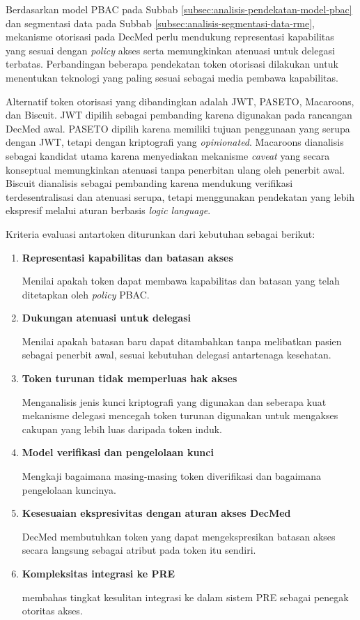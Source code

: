 \documentclass[bahasa, 12pt, a4paper, onecolumn, oneside, final]{report}
\begin{document}
Berdasarkan model PBAC pada Subbab \ref{subsec:analisis-pendekatan-model-pbac} dan segmentasi data pada Subbab \ref{subsec:analisis-segmentasi-data-rme}, mekanisme otorisasi pada DecMed perlu mendukung representasi kapabilitas yang sesuai dengan \textit{policy} akses serta memungkinkan atenuasi untuk delegasi terbatas. Perbandingan beberapa pendekatan token otorisasi dilakukan untuk menentukan teknologi yang paling sesuai sebagai media pembawa kapabilitas.

Alternatif token otorisasi yang dibandingkan adalah JWT, PASETO, Macaroons, dan Biscuit. JWT dipilih sebagai pembanding karena digunakan pada rancangan DecMed awal. PASETO dipilih karena memiliki tujuan penggunaan yang serupa dengan JWT, tetapi dengan kriptografi yang \textit{opinionated}. Macaroons dianalisis sebagai kandidat utama karena menyediakan mekanisme \textit{caveat} yang secara konseptual memungkinkan atenuasi tanpa penerbitan ulang oleh penerbit awal. Biscuit dianalisis sebagai pembanding karena mendukung verifikasi terdesentralisasi dan atenuasi serupa, tetapi menggunakan pendekatan yang lebih ekspresif melalui aturan berbasis \textit{logic language}.

Kriteria evaluasi antartoken diturunkan dari kebutuhan sebagai berikut:
\begin{enumerate}
	\item \textbf{Representasi kapabilitas dan batasan akses}

	      Menilai apakah token dapat membawa kapabilitas dan batasan yang telah ditetapkan oleh \textit{policy} PBAC.
	\item \textbf{Dukungan atenuasi untuk delegasi}

	      Menilai apakah batasan baru dapat ditambahkan tanpa melibatkan pasien sebagai penerbit awal, sesuai kebutuhan delegasi antartenaga kesehatan.
	\item \textbf{Token turunan tidak memperluas hak akses}

	      Menganalisis jenis kunci kriptografi yang digunakan dan seberapa kuat mekanisme delegasi mencegah token turunan digunakan untuk mengakses cakupan yang lebih luas daripada token induk.
	\item \textbf{Model verifikasi dan pengelolaan kunci}

	      Mengkaji bagaimana masing-masing token diverifikasi dan bagaimana pengelolaan kuncinya.
	\item \textbf{Kesesuaian ekspresivitas dengan aturan akses DecMed}

	      DecMed membutuhkan token yang dapat mengekspresikan batasan akses secara langsung sebagai atribut pada token itu sendiri.
	\item \textbf{Kompleksitas integrasi ke PRE}

	      membahas tingkat kesulitan integrasi ke dalam sistem PRE sebagai penegak otoritas akses.
\end{enumerate}
\end{document}
